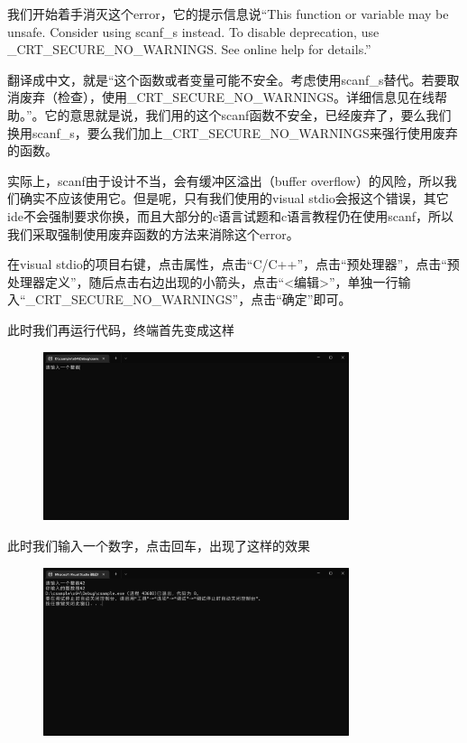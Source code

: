 我们开始着手消灭这个error，它的提示信息说“This function or variable may be unsafe. Consider using scanf\_s instead. To disable deprecation, use \_CRT\_SECURE\_NO\_WARNINGS. See online help for details.”

翻译成中文，就是“这个函数或者变量可能不安全。考虑使用scanf\_s替代。若要取消废弃（检查），使用\_CRT\_SECURE\_NO\_WARNINGS。详细信息见在线帮助。”。它的意思就是说，我们用的这个scanf函数不安全，已经废弃了，要么我们换用scanf\_s，要么我们加上\_CRT\_SECURE\_NO\_WARNINGS来强行使用废弃的函数。

实际上，scanf由于设计不当，会有缓冲区溢出（buffer overflow）的风险，所以我们确实不应该使用它。但是呢，只有我们使用的visual stdio会报这个错误，其它ide不会强制要求你换，而且大部分的c语言试题和c语言教程仍在使用scanf，所以我们采取强制使用废弃函数的方法来消除这个error。

在visual stdio的项目右键，点击属性，点击“C/C++”，点击“预处理器”，点击“预处理器定义”，随后点击右边出现的小箭头，点击“<编辑>”，单独一行输入“\_CRT\_SECURE\_NO\_WARNINGS”，点击“确定”即可。

此时我们再运行代码，终端首先变成这样

\begin{figure}[H]
    \centering
    \includegraphics[width=0.8\textwidth, height=0.3\textheight]{images/1scanf首次.png}
\end{figure}

此时我们输入一个数字，点击回车，出现了这样的效果

\begin{figure}[H]
    \centering
    \includegraphics[width=0.8\textwidth, height=0.3\textheight]{images/1scanf完成.png}
\end{figure}

